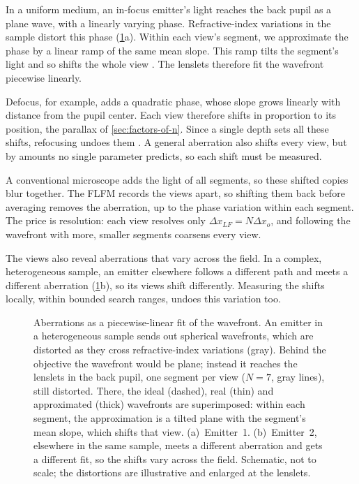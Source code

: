 In a uniform medium, an in-focus emitter's light reaches the back pupil as a plane wave, with a linearly varying phase. Refractive-index variations in the sample distort this phase (\cref{fig:aberration-segments}a). Within each view's segment, we approximate the phase by a linear ramp of the same mean slope. This ramp tilts the segment's light and so shifts the whole view \cite{ji2010adaptiveOpticsPupilSegmentation}. The lenslets therefore fit the wavefront piecewise linearly.

Defocus, for example, adds a quadratic phase, whose slope grows linearly with distance from the pupil center. Each view therefore shifts in proportion to its position, the parallax of \cref{sec:factors-of-n}. Since a single depth sets all these shifts, refocusing undoes them \cite{levoy2009recordingControlling4d}. A general aberration also shifts every view, but by amounts no single parameter predicts, so each shift must be measured.

A conventional microscope adds the light of all segments, so these shifted copies blur together. The FLFM records the views apart, so shifting them back before averaging removes the aberration, up to the phase variation within each segment. The price is resolution: each view resolves only $\Delta x_{LF}=N\Delta x_o$, and following the wavefront with more, smaller segments coarsens every view.

The views also reveal aberrations that vary across the field. In a complex, heterogeneous sample, an emitter elsewhere follows a different path and meets a different aberration (\cref{fig:aberration-segments}b), so its views shift differently. Measuring the shifts locally, within bounded search ranges, undoes this variation too.

\begin{figure}[tbp]
    \centering
    \resizebox{\textwidth}{!}{}
    \caption[Aberrations as a piecewise-linear fit of the wavefront.]{Aberrations as a piecewise-linear fit of the wavefront. An emitter in a heterogeneous sample sends out spherical wavefronts, which are distorted as they cross refractive-index variations (gray). Behind the objective the wavefront would be plane; instead it reaches the lenslets in the back pupil, one segment per view ($N=7$, gray lines), still distorted. There, the ideal (dashed), real (thin) and approximated (thick) wavefronts are superimposed: within each segment, the approximation is a tilted plane with the segment's mean slope, which shifts that view. (a)~Emitter~1. (b)~Emitter~2, elsewhere in the same sample, meets a different aberration and gets a different fit, so the shifts vary across the field. Schematic, not to scale; the distortions are illustrative and enlarged at the lenslets.}
    \label{fig:aberration-segments}
\end{figure}

